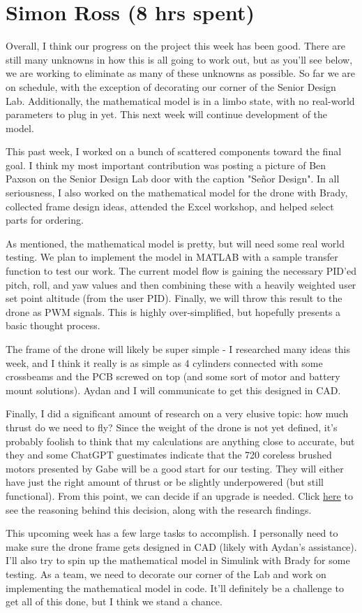 \documentclass[12pt, titlepage]{article}
\begin{document}
\section*{Simon Ross (8 hrs spent)}

Overall, I think our progress on the project this week has been good. There are still many unknowns in how this is all going to work out, but as you'll see below, we are working to eliminate as many of these unknowns as possible. So far we are on schedule, with the exception of decorating our corner of the Senior Design Lab. Additionally, the mathematical model is in a limbo state, with no real-world parameters to plug in yet. This next week will continue development of the model. 

This past week, I worked on a bunch of scattered components toward the final goal. I think my most important contribution was posting a picture of Ben Paxson on the Senior Design Lab door with the caption "Se\~nor Design". In all seriousness, I also worked on the mathematical model for the drone with Brady, collected frame design ideas, attended the Excel workshop, and helped select parts for ordering. 

As mentioned, the mathematical model is pretty, but will need some real world testing. We plan to implement the model in MATLAB with a sample transfer function to test our work. The current model flow is gaining the necessary PID'ed pitch, roll, and yaw values and then combining these with a heavily weighted user set point altitude (from the user PID). Finally, we will throw this result to the drone as PWM signals.  This is highly over-simplified, but hopefully presents a basic thought process. 

The frame of the drone will likely be super simple - I researched many ideas this week, and I think it really is as simple as 4 cylinders connected with some crossbeams and the PCB screwed on top (and some sort of motor and battery mount solutions). Aydan and I will communicate to get this designed in CAD. 

Finally, I did a significant amount of research on a very elusive topic: how much thrust do we need to fly? Since the weight of the drone is not yet defined, it's probably foolish to think that my calculations are anything close to accurate, but they and some ChatGPT guestimates indicate that the 720 coreless brushed motors presented by Gabe will be a good start for our testing. They will either have just the right amount of thrust or be slightly underpowered (but still functional). From this point, we can decide if an upgrade is needed. Click \href{https://github.com/gh0stpr0t0c0l/fcl_senior_design/blob/main/fall_2025/notes/2025_9_21_Weight_Estimate.md}{here} to see the reasoning behind this decision, along with the research findings.

This upcoming week has a few large tasks to accomplish. I personally need to make sure the drone frame gets designed in CAD (likely with Aydan's assistance). I'll also try to spin up the mathematical model in Simulink with Brady for some testing. As a team, we need to decorate our corner of the Lab and work on implementing the mathematical model in code. It'll definitely be a challenge to get all of this done, but I think we stand a chance.
\end{document}
